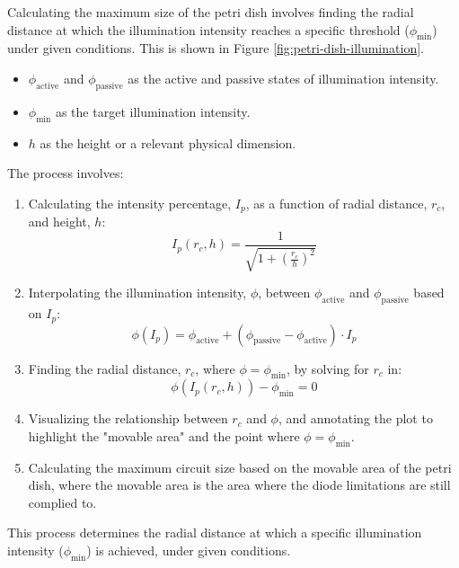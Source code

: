 Calculating the maximum size of the petri dish involves finding the radial distance at which the illumination intensity reaches a specific threshold (\(\phi_{\text{min}}\)) under given conditions. 
This is shown in Figure \ref{fig:petri-dish-illumination}.
\begin{itemize}
    \item \( \phi_{\text{active}} \) and \( \phi_{\text{passive}} \) as the active and passive states of illumination intensity.
    \item \( \phi_{\text{min}} \) as the target illumination intensity.
    \item \( h \) as the height or a relevant physical dimension.
\end{itemize}
The process involves:
\begin{enumerate}
    \item Calculating the intensity percentage, \(I_p\), as a function of radial distance, \(r_c\), and height, \(h\):
    \[I_p(r_c, h) = \frac{1}{\sqrt{1 + \left(\frac{r_c}{h}\right)^2}}\]

    \item Interpolating the illumination intensity, \(\phi\), between \(\phi_{\text{active}}\) and \(\phi_{\text{passive}}\) based on \(I_p\):
    \[\phi(I_p) = \phi_{\text{active}} + (\phi_{\text{passive}} - \phi_{\text{active}}) \cdot I_p\]

    \item Finding the radial distance, \(r_c\), where \(\phi = \phi_{\text{min}}\), by solving for \(r_c\) in:
    \[\phi(I_p(r_c, h)) - \phi_{\text{min}} = 0\]

    \item Visualizing the relationship between \(r_c\) and \(\phi\), and annotating the plot to highlight the "movable area" and the point where \(\phi = \phi_{\text{min}}\).
    \item Calculating the maximum circuit size based on the movable area of the petri dish, where the movable area is 
    the area where the diode limitations are still complied to.
\end{enumerate}

This process determines the radial distance at which a specific illumination intensity (\(\phi_{\text{min}}\)) is achieved, under given conditions.

